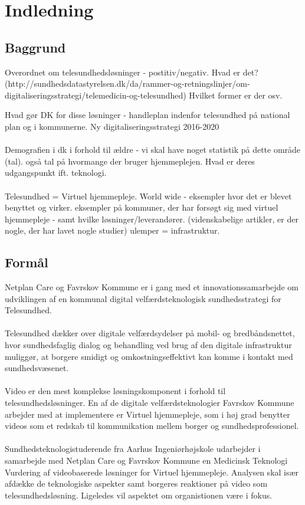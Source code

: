 \chapter{Indledning}

\section{Baggrund}




Overordnet om telesundhedsløsninger - postitiv/negativ. Hvad er det? (http://sundhedsdatastyrelsen.dk/da/rammer-og-retningslinjer/om-digitaliseringsstrategi/telemedicin-og-telesundhed) Hvilket former er der osv. 


Hvad gør DK for disse løsninger - handleplan indenfor telesundhed på national plan og i kommunerne. Ny digitaliseringsstrategi 2016-2020
\\ \\
Demografien i dk i forhold til ældre - vi skal have noget statistik på dette område (tal). også tal på hvormange der bruger hjemmeplejen. Hvad er deres udgangspunkt ift. teknologi. 
\\ \\
Telesundhed = Virtuel hjemmepleje. World wide - eksempler hvor det er blevet benyttet og virker. eksempler på kommuner, der har forsøgt sig med virtuel hjemmepleje - samt hvilke løsninger/leverandører. (videnskabelige artikler, er der nogle, der har lavet nogle studier) 
ulemper = infrastruktur.
 

\section{Formål}
Netplan Care og Favrskov Kommune er i gang med et innovationssamarbejde om udviklingen af en kommunal digital velfærdsteknologisk sundhedsstrategi for Telesundhed. 
\\ \\
Telesundhed dækker over digitale velfærdsydelser på mobil- og bredbåndsnettet, hvor sundhedsfaglig dialog og behandling ved brug af den digitale infrastruktur muliggør, at borgere smidigt og omkostningseffektivt kan komme i kontakt med sundhedsvæsenet.    
\\ \\
Video er den mest komplekse løsningskomponent i forhold til telesundhedsløsninger. En af de digitale velfærdsteknologier Favrskov Kommune arbejder med at implementere er Virtuel hjemmepleje, som i høj grad benytter videos som et redskab til kommunikation mellem borger og sundhedsprofessionel. 
\\ \\
Sundhedsteknologistuderende fra Aarhus Ingeniørhøjskole udarbejder i samarbejde med Netplan Care og Favrskov Kommune en Medicinsk Teknologi Vurdering af videobaserede løsninger for Virtuel hjemmepleje. Analysen skal især afdække de teknologiske aspekter samt borgeres reaktioner på video som telesundhedsløsning. Ligeledes vil aspektet om organistionen være i fokus. 

